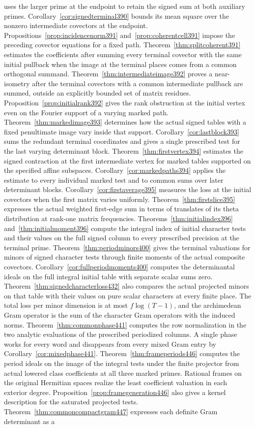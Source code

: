 \documentclass[a4paper,11pt]{article}
\theoremstyle{definition}
\theoremstyle{remark}
\numberwithin{equation}{section}
\begin{document}
uses the larger prime at the endpoint to retain the signed sum at both auxiliary primes. Corollary~\ref{cor:signedterminal390} bounds its mean square over the nonzero intermediate covectors at the endpoint. Propositions~\ref{prop:incidencenorm391} and~\ref{prop:coherentcell391} impose the preceding covector equations for a fixed path. Theorem~\ref{thm:splitcoherent391} estimates the coefficients after summing every terminal covector with the same initial pullback when the image at the terminal places comes from a common orthogonal summand. Theorem~\ref{thm:intermediateimage392} proves a near-isometry after the terminal covectors with a common intermediate pullback are summed, outside an explicitly bounded set of matrix residues. Proposition~\ref{prop:initialrank392} gives the rank obstruction at the initial vertex even on the Fourier support of a varying marked path. Theorem~\ref{thm:markedimage393} determines how the actual signed tables with a fixed penultimate image vary inside that support. Corollary~\ref{cor:lastblock393} sums the redundant terminal coordinates and gives a single prescribed test for the last varying determinant block. Theorem~\ref{thm:firstvertex394} estimates the signed contraction at the first intermediate vertex for marked tables supported on the specified affine subspaces. Corollary~\ref{cor:markedpaths394} applies the estimate to every individual marked test and to common sums over later determinant blocks. Corollary~\ref{cor:firstaverage395} measures the loss at the initial covectors when the first matrix varies uniformly. Theorem~\ref{thm:firstslice395} expresses the actual weighted first-edge sum in terms of translates of its theta distribution at rank-one matrix frequencies. Theorems~\ref{thm:initialindex396} and~\ref{thm:initialmoment396} compute the integral index of initial character tests and their values on the full signed column to every prescribed precision at the terminal prime. Theorem~\ref{thm:periodminors400} gives the terminal valuations for minors of signed character tests through finite moments of the actual composite covectors. Corollary~\ref{cor:fullperiodmoments400} computes the determinantal ideals on the full integral initial table with separate scalar sums zero. Theorem~\ref{thm:signedcharacterloss432} also compares the actual projected minors on that table with their values on pure scalar characters at every finite place. The total loss per minor dimension is at most \(f\log(T-1)\), and the archimedean Gram operator is the sum of the character Gram operators with the induced norms. Theorem~\ref{thm:commonphase441} computes the row normalization in the two analytic evaluations of the prescribed periodized columns. A single phase works for every word and disappears from every mixed Gram entry by Corollary~\ref{cor:mixedphase441}. Theorem~\ref{thm:frameperiods446} computes the period ideals on the image of the integral tests under the finite projector from actual lowered class coefficients at all three marked primes. Rational frames on the original Hermitian spaces realize the least coefficient valuation in each exterior degree. Proposition~\ref{prop:framegeneration446} also gives a kernel description for the saturated projected tests. Theorem~\ref{thm:commoncompactgram447} expresses each definite Gram determinant as a 
\end{document}
